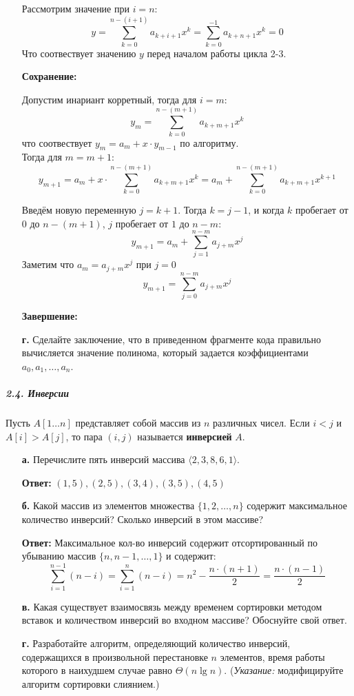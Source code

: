 \begin{itemize}
    Рассмотрим значение при $i = n$:
    \[
    y = \sum_{k=0}^{n-(i+1)} a_{k+i+1} x^k = \sum_{k=0}^{-1} a_{k+n+1} x^k = 0  
    \]
    Что соотвествует значению $y$ перед началом работы цикла 2-3.

    \textbf{Сохранение:}

    Допустим инариант корретный, тогда для $i = m$:
    \[
    y_m = \sum_{k=0}^{n-(m+1)} a_{k+m+1} x^k 
    \]
    что соотвествует $y_m = a_m + x \cdot y_{m-1}$ по алгоритму. \\

    Тогда для $m = m + 1$:
    \[
    y_{m+1} = a_{m} + x \cdot \sum_{k=0}^{n-(m+1)} a_{k+m+1} x^k = a_{m} + \sum_{k=0}^{n-(m+1)} a_{k+m+1} x^{k+1} 
    \]

    Введём новую переменную $j = k+1$. Тогда $k = j-1$, и когда $k$ пробегает от $0$ до $n-(m+1)$, $j$ пробегает от $1$ до $n-m$:
    \[
    y_{m+1} = a_{m} + \sum_{j=1}^{n-m} a_{j+m} x^{j} 
    \]
    Заметим что $a_{m} = a_{j+m} x^{j}$ при $j = 0$
    \[
    y_{m+1} = \sum_{j=0}^{n-m} a_{j+m} x^{j}
    \]

    \textbf{Завершение:}

    \item[\textbf{г.}] Сделайте заключение, что в приведенном фрагменте кода правильно вычисляется значение полинома, который задается коэффициентами $a_0, a_1, \dots, a_n$.
\end{itemize}

\subparagraph{2.4. Инверсии}

Пусть $A[1 \dots n]$ представляет собой массив из $n$ различных чисел. Если $i < j$ и $A[i] > A[j]$, то пара $(i, j)$ называется \textbf{инверсией} $A$.

\begin{itemize}
    \item[\textbf{а.}] Перечислите пять инверсий массива $\langle 2, 3, 8, 6, 1 \rangle$.
    
    \textbf{Ответ:} $(1, 5), (2, 5), (3, 4), (3, 5), (4, 5)$

    \item[\textbf{б.}] Какой массив из элементов множества $\{1, 2, \dots, n\}$ содержит максимальное количество инверсий? Сколько инверсий в этом массиве?
    
    \textbf{Ответ:} Максимальное кол-во инверсий содержит отсортированный по убыванию массив $\{n, n-1, \dots, 1\}$ и содержит:
    \[
    \sum_{i = 1}^{n-1}{\left(n-i\right)} = \sum_{i = 1}^{n}{ \left(n-i\right) } = n^2 - \frac{n \cdot (n + 1)}{2} = \frac{n \cdot (n - 1)}{2}
    \]
    
    \item[\textbf{в.}] Какая существует взаимосвязь между временем сортировки методом вставок и количеством инверсий во входном массиве? Обоснуйте свой ответ.
    

    \item[\textbf{г.}] Разработайте алгоритм, определяющий количество инверсий, содержащихся в произвольной перестановке $n$ элементов, время работы которого в наихудшем случае равно $\Theta(n \lg n)$. (\textit{Указание:} модифицируйте алгоритм сортировки слиянием.)
\end{itemize}